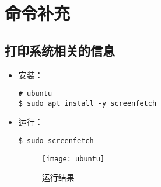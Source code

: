 \chapter{命令补充}

\section{打印系统相关的信息}
\begin{itemize}
\item 安装：
\begin{lstlisting}
# ubuntu 
$ sudo apt install -y screenfetch 
\end{lstlisting}

\item 运行：
\begin{lstlisting}
$ sudo screenfetch
\end{lstlisting}


\begin{figure}[hbt!] 
    \centering
    \texttt{[image: ubuntu]}
    \caption{运行结果} %
    \label{fig:ubuntu_screenfetch} %
\end{figure}
\end{itemize}
\newpage


